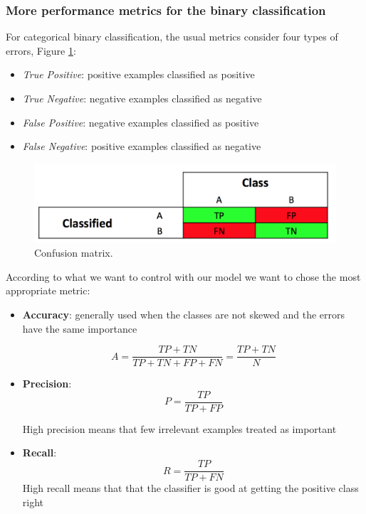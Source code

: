 \subsubsection*{More performance metrics for the binary classification}

For categorical binary classification, the usual metrics consider four types of errors, Figure \ref{pic:confusion_matrix}:

\begin{itemize}
\item \emph{True Positive}: positive examples classified as positive
\item \emph{True Negative}: negative examples classified as negative
\item \emph{False Positive}: negative examples classified as positive
\item \emph{False Negative}: positive examples classified as negative
\end{itemize}

\begin{figure}[H]%
 \centering
 \includegraphics[width=13cm]{./img/08/confusion_matrix}
 \caption{\label{pic:confusion_matrix} Confusion matrix.}
\end{figure}

According to what we want to control with our model we want to chose the most appropriate metric:
\begin{itemize}
\item \textbf{Accuracy}: generally used when the classes are not skewed
and the errors have the same importance

$$A = \frac{TP+TN}{TP+TN+FP+FN} =  \frac{TP+TN}{N}$$

\item \textbf{Precision}: 
$$P = \frac{TP}{TP+FP}$$

High precision means that few irrelevant examples treated as important 
\item \textbf{Recall}: 
$$	R = \frac{TP}{TP+FN}$$
High recall means that that the classifier is good at getting the positive class right
\end{itemize}

